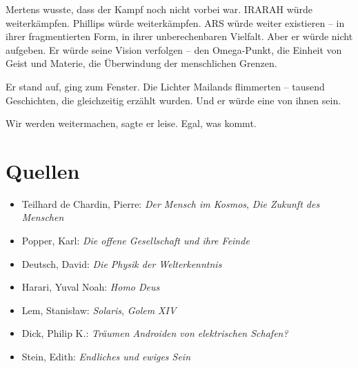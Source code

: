 \documentclass[
]{article}
\begin{document}
Mertens wusste, dass der Kampf noch nicht vorbei war. IRARAH würde weiterkämpfen. Phillips würde weiterkämpfen. ARS würde weiter existieren -- in ihrer fragmentierten Form, in ihrer unberechenbaren Vielfalt. Aber er würde nicht aufgeben. Er würde seine Vision verfolgen -- den Omega-Punkt, die Einheit von Geist und Materie, die Überwindung der menschlichen Grenzen.

Er stand auf, ging zum Fenster. Die Lichter Mailands flimmerten -- tausend Geschichten, die gleichzeitig erzählt wurden. Und er würde eine von ihnen sein.

\glqq Wir werden weitermachen\grqq, sagte er leise. \glqq Egal, was kommt.\grqq

\newpage

\section{Quellen}

\begin{itemize}
\item Teilhard de Chardin, Pierre: \emph{Der Mensch im Kosmos}, \emph{Die Zukunft des Menschen}
\item Popper, Karl: \emph{Die offene Gesellschaft und ihre Feinde}
\item Deutsch, David: \emph{Die Physik der Welterkenntnis}
\item Harari, Yuval Noah: \emph{Homo Deus}
\item Lem, Stanisław: \emph{Solaris}, \emph{Golem XIV}
\item Dick, Philip K.: \emph{Träumen Androiden von elektrischen Schafen?}
\item Stein, Edith: \emph{Endliches und ewiges Sein}
\end{itemize}
\end{document}
